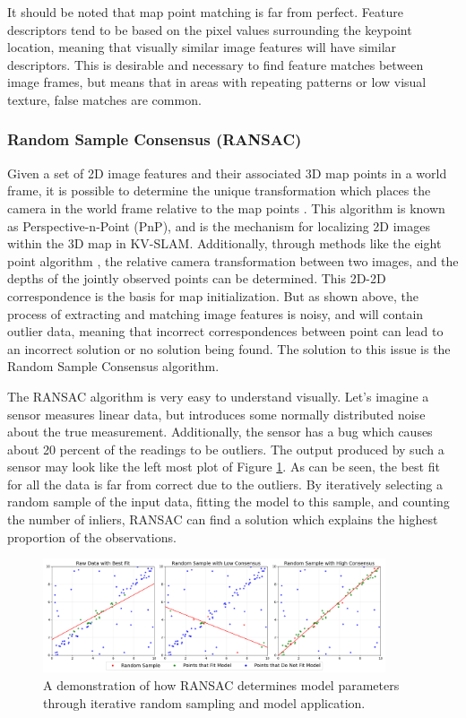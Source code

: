 It should be noted that map point matching is far from perfect. Feature descriptors tend to be based on the pixel values surrounding the keypoint location, meaning that visually similar image features will have similar descriptors. This is desirable and necessary to find feature matches between image frames, but means that in areas with repeating patterns or low visual texture, false matches are common.

\subsubsection{Random Sample Consensus (RANSAC)}

Given a set of 2D image features and their associated 3D map points in a world frame, it is possible to determine the unique transformation which places the camera in the world frame relative to the map points \cite{longuet-higginsComputerAlgorithmReconstructing1981}. This algorithm is known as Perspective-n-Point (PnP), and is the mechanism for localizing 2D images within the 3D map in KV-SLAM. Additionally, through methods like the eight point algorithm \cite{hartleyDefenseEightpointAlgorithm1997}, the relative camera transformation between two images, and the depths of the jointly observed points can be determined. This 2D-2D correspondence is the basis for map initialization. But as shown above, the process of extracting and matching image features is noisy, and will contain outlier data, meaning that incorrect correspondences between point can lead to an incorrect solution or no solution being found. The solution to this issue is the Random Sample Consensus algorithm.

The RANSAC algorithm is very easy to understand visually. Let's imagine a sensor measures linear data, but introduces some normally distributed noise about the true measurement. Additionally, the sensor has a bug which causes about 20 percent of the readings to be outliers. The output produced by such a sensor may look like the left most plot of Figure \ref{fig:ransac}. As can be seen, the best fit for all the data is far from correct due to the outliers. By iteratively selecting a random sample of the input data, fitting the model to this sample, and counting the number of inliers, RANSAC can find a solution which explains the highest proportion of the observations.

\begin{figure}[!ht]
    \centering
    \includegraphics[width=0.9\textwidth]{resources/ransac.png}
    \caption[2D RANSAC Example]{A demonstration of how RANSAC determines model parameters through iterative random sampling and model application.}
    \label{fig:ransac}
\end{figure}

